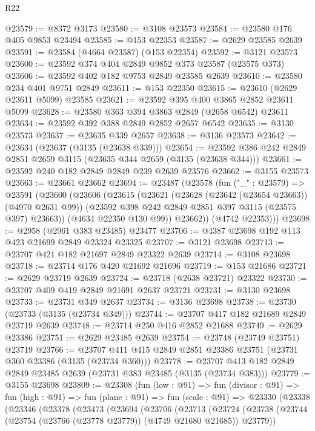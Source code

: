\begin{lexlean}{R22}
\begin{coremodule}
@23579 := @8372 @3173
@23580 := @3108 @23573
@23584 := @23580 @176 @405 @9853 @23494
@23585 := @153 @22353
@23587 := @2629 @23585 @2639
@23591 := @23584 (@4664 @23587) (@153 @22354)
@23592 := @3121 @23573
@23600 := @23592 @374 @404 @2849 @9852 @373 @23587 (@23575 @373)
@23606 := @23592 @402 @182 @9753 @2849 @23585 @2639
@23610 := @23580 @234 @401 @9751 @2849
@23611 := @153 @22350
@23615 := @23610 (@2629 @23611 @5099) @23585
@23621 := @23592 @395 @400 @3865 @2852 @23611 @5099
@23628 := @23580 @363 @394 @3863 @2849 (@2658 @6542) @23611
@23634 := @23592 @392 @388 @2849 @2852 @2657 @6542
@23635 := @3130 @23573
@23637 := @23635 @339 @2657
@23638 := @3136 @23573
@23642 := @23634 (@23637 (@3135 (@23638 @339)))
@23654 := @23592 @386 @242 @2849 @2851 @2659 @3115 (@23635 @344 @2659 (@3135 (@23638 @344)))
@23661 := @23592 @240 @182 @2849 @2849 @239 @2639 @23576
@23662 := @3155 @23573
@23663 := @23661 @23662
@23694 := @23487
    (@23578
      (fun ("_" : @23579) =>
      @23591
        (@23600
          (@23606
            (@23615
              (@23621
                (@23628 (@23642 (@23654 @23663)) (@4970 @2631 @99))
                (@23592 @398 @242 @2849 @2851 @397 @3115 (@23575 @397) @23663))
              (@4634 @22350 @130 @99))
            @23662))
        (@4742 @22353)))
@23698 := @2958 (@2961 @383 @23485) @23477
@23706 := @4387 @23698 @192 @113 @423 @21699 @2849 @23324 @23325
@23707 := @3121 @23698
@23713 := @23707 @421 @182 @21697 @2849 @23322 @2639
@23714 := @3108 @23698
@23718 := @23714 @176 @420 @21692 @21696
@23719 := @153 @21686
@23721 := @2629 @23719 @2639
@23724 := @23718 (@2638 @23721) @23322
@23730 := @23707 @409 @419 @2849 @21691 @2637 @23721
@23731 := @3130 @23698
@23733 := @23731 @349 @2637
@23734 := @3136 @23698
@23738 := @23730 (@23733 (@3135 (@23734 @349)))
@23744 := @23707 @417 @182 @21689 @2849 @23719 @2639
@23748 := @23714 @250 @416 @2852 @21688
@23749 := @2629 @23386
@23751 := @2629 @23485 @2639
@23754 := @23748 (@23749 @23751) @23719
@23766 := @23707 @411 @415 @2849 @2851 @23386 @23751 (@23731 @360 @23386 (@3135 (@23734 @360)))
@23778 := @23707 @413 @182 @2849 @2849 @23485 @2639 (@23731 @383 @23485 (@3135 (@23734 @383)))
@23779 := @3155 @23698
@23809 := @23308
    (fun (low : @91) =>
    fun (divisor : @91) =>
    fun (high : @91) =>
    fun (plane : @91) =>
    fun (scale : @91) =>
    @23330
      (@23338
        (@23346
          (@23378
            (@23473
              (@23694
                (@23706
                  (@23713
                    (@23724
                      (@23738
                        (@23744 (@23754 (@23766 (@23778 @23779)) (@4749 @21680 @21685)) @23779))

\end{coremodule}
\end{lexlean}

